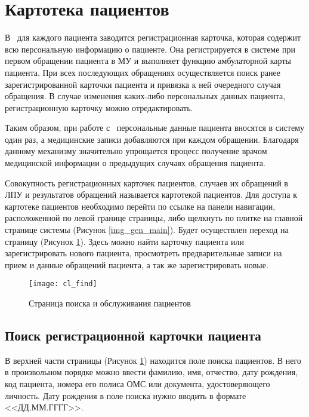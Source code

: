 \newpage
\section{Картотека пациентов}

В \tmisp ~для каждого пациента заводится регистрационная карточка, которая содержит всю персональную информацию о пациенте. Она регистрируется в системе при первом обращении пациента в МУ и выполняет функцию амбулаторной карты пациента. При всех последующих обращениях осуществляется поиск ранее зарегистрированной карточки пациента и привязка к ней очередного случая обращения. В случае изменения каких-либо персональных данных пациента, регистрационную карточку можно отредактировать. 

Таким образом, при работе с \tmist~персональные данные пациента вносятся в систему один раз, а медицинские записи добавляются при каждом обращении. Благодаря данному механизму значительно упрощается процесс получение врачом медицинской информации о предыдущих случаях обращения пациента.

Совокупность регистрационных карточек пациентов, случаев их обращений в ЛПУ и результатов обращений называется картотекой пациентов. Для доступа к картотеке пациентов необходимо перейти по ссылке  на панели навигации, расположенной по левой границе страницы, либо щелкнуть по плитке  на главной странице системы (Рисунок \ref{img_gen_main}). Будет осуществлен переход на страницу  (Рисунок \ref{img_cl_find}). Здесь можно найти карточку пациента или зарегистрировать нового пациента, просмотреть предварительные записи на прием и данные обращений пациента, а так же зарегистрировать новые.

\begin{figure}[ht]\centering
 \texttt{[image: cl\_find]}
 \caption{Страница поиска и обслуживания пациентов}
 \label{img_cl_find}
\end{figure} 

\subsection{Поиск регистрационной карточки пациента} \label{cl_find}

В верхней части страницы   (Рисунок \ref{img_cl_find}) находится поле поиска пациентов. В него в произвольном порядке можно ввести фамилию, имя, отчество, дату рождения, код пациента, номера его полиса ОМС или документа, удостоверяющего личность. Дату рождения в поле поиска нужно вводить в формате <<ДД.ММ.ГГГГ>>. %

